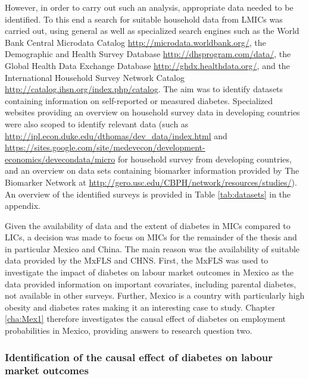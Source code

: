 However, in order to carry out such an analysis, appropriate data needed to be identified. To this end a search for suitable household data from \acp{LMIC} was carried out, using general as well as specialized search engines such as the World Bank Central Microdata Catalog  \url{http://microdata.worldbank.org/}, the Demographic and Health Survey Database \url{http://dhsprogram.com/data/}, the Global Health Data Exchange Database \url{http://ghdx.healthdata.org/}, and the International Household Survey Network Catalog \url{http://catalog.ihsn.org/index.php/catalog}. The aim was to identify datasets containing information on self-reported or measured diabetes. Specialized websites providing an overview on household survey data in developing countries were also scoped to identify relevant data (such as \url{http://ipl.econ.duke.edu/dthomas/dev_data/index.html} and \url{https://sites.google.com/site/medevecon/development-economics/devecondata/micro} for household survey from developing countries, and an overview on data sets containing biomarker information provided by The Biomarker Network at \url{http://gero.usc.edu/CBPH/network/resources/studies/}). An overview of the identified surveys is provided in Table \ref{tab:datasets} in the appendix.

Given the availability of data and the extent of diabetes in \acp{MIC} compared to \acp{LIC}, a decision was made to focus on \acp{MIC} for the remainder of the thesis and in particular Mexico and China. The main reason was the availability of suitable  data provided by the \ac{MxFLS} and \ac{CHNS}. First, the \ac{MxFLS} was used to investigate the impact of diabetes on labour market outcomes in Mexico as the data provided information on important covariates, including parental diabetes, not available in other surveys. Further, Mexico is a country with particularly high obesity and diabetes rates making it an interesting case to study. Chapter \ref{cha:Mex1} therefore investigates the causal effect of diabetes on employment probabilities in Mexico, providing answers to research question two.

\subsubsection{Identification of the causal effect of diabetes on labour market outcomes}

